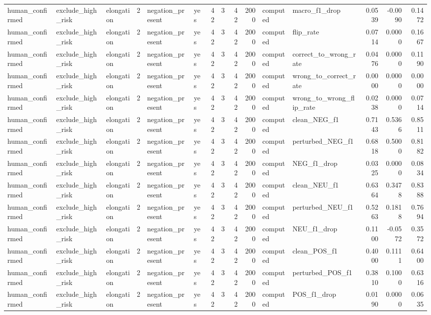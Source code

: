 \begin{tabular}{lllrllrrrrllrrr}
human_confirmed & exclude_high_risk & elongation & 2 & negation_present & yes & 42 & 3 & 42 & 2000 & computed & macro_f1_drop & 0.0539 & -0.0090 & 0.1472 \\
human_confirmed & exclude_high_risk & elongation & 2 & negation_present & yes & 42 & 3 & 42 & 2000 & computed & flip_rate & 0.0714 & 0.0000 & 0.1667 \\
human_confirmed & exclude_high_risk & elongation & 2 & negation_present & yes & 42 & 3 & 42 & 2000 & computed & correct_to_wrong_rate & 0.0476 & 0.0000 & 0.1190 \\
human_confirmed & exclude_high_risk & elongation & 2 & negation_present & yes & 42 & 3 & 42 & 2000 & computed & wrong_to_correct_rate & 0.0000 & 0.0000 & 0.0000 \\
human_confirmed & exclude_high_risk & elongation & 2 & negation_present & yes & 42 & 3 & 42 & 2000 & computed & wrong_to_wrong_flip_rate & 0.0238 & 0.0000 & 0.0714 \\
human_confirmed & exclude_high_risk & elongation & 2 & negation_present & yes & 42 & 3 & 42 & 2000 & computed & clean_NEG_f1 & 0.7143 & 0.5366 & 0.8511 \\
human_confirmed & exclude_high_risk & elongation & 2 & negation_present & yes & 42 & 3 & 42 & 2000 & computed & perturbed_NEG_f1 & 0.6818 & 0.5000 & 0.8182 \\
human_confirmed & exclude_high_risk & elongation & 2 & negation_present & yes & 42 & 3 & 42 & 2000 & computed & NEG_f1_drop & 0.0325 & 0.0000 & 0.0834 \\
human_confirmed & exclude_high_risk & elongation & 2 & negation_present & yes & 42 & 3 & 42 & 2000 & computed & clean_NEU_f1 & 0.6364 & 0.3478 & 0.8388 \\
human_confirmed & exclude_high_risk & elongation & 2 & negation_present & yes & 42 & 3 & 42 & 2000 & computed & perturbed_NEU_f1 & 0.5263 & 0.1818 & 0.7694 \\
human_confirmed & exclude_high_risk & elongation & 2 & negation_present & yes & 42 & 3 & 42 & 2000 & computed & NEU_f1_drop & 0.1100 & -0.0572 & 0.3572 \\
human_confirmed & exclude_high_risk & elongation & 2 & negation_present & yes & 42 & 3 & 42 & 2000 & computed & clean_POS_f1 & 0.4000 & 0.1111 & 0.6400 \\
human_confirmed & exclude_high_risk & elongation & 2 & negation_present & yes & 42 & 3 & 42 & 2000 & computed & perturbed_POS_f1 & 0.3810 & 0.1000 & 0.6316 \\
human_confirmed & exclude_high_risk & elongation & 2 & negation_present & yes & 42 & 3 & 42 & 2000 & computed & POS_f1_drop & 0.0190 & 0.0000 & 0.0635 \\

\end{tabular}
